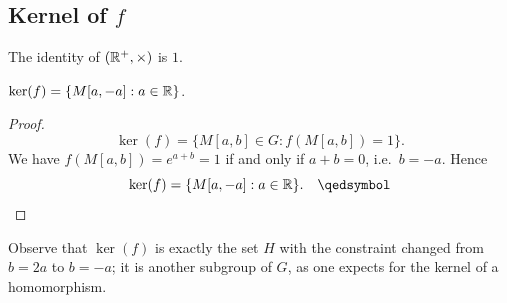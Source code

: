 \subsection{Kernel of \texorpdfstring{$f$}{f}}

The identity of $(\mathbb{R}^{+}, \times)$ is $1$.

\begin{proposition}
$\ker(f) = \{M[a,-a] : a \in \mathbb{R}\}$.
\end{proposition}

\begin{proof}
\[
    \ker(f) = \{M[a,b] \in G : f(M[a,b]) = 1\}.
\]
We have $f(M[a,b]) = e^{a+b} = 1$ if and only if $a + b = 0$, i.e.\ $b = -a$.
Hence
\[
    \ker(f) = \{M[a,-a] : a \in \R\}. \qedhere
\]
\end{proof}

\begin{remark}
Observe that $\ker(f)$ is exactly the set $H$ with the constraint changed from
$b = 2a$ to $b = -a$; it is another subgroup of $G$, as one expects for the
kernel of a homomorphism.
\end{remark}
